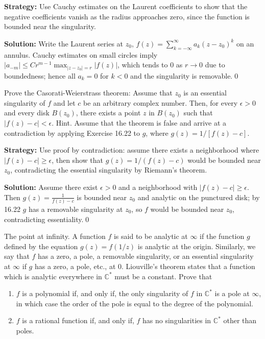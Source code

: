 \noindent\textbf{Strategy:} Use Cauchy estimates on the Laurent coefficients to show that the negative coefficients vanish as the radius approaches zero, since the function is bounded near the singularity.

\bigskip\noindent\textbf{Solution:}
Write the Laurent series at $z_0$, $f(z)=\sum_{k=-\infty}^{\infty} a_k(z-z_0)^k$ on an annulus. Cauchy estimates on small circles imply $|a_{-m}|\le C r^{m-1}\max_{|z-z_0|=r}|f(z)|$, which tends to $0$ as $r\to0$ due to boundedness; hence all $a_{k}=0$ for $k<0$ and the singularity is removable.\qed


\begin{problembox}
Prove the Casorati-Weierstrass theorem: Assume that \( z_0 \) is an essential singularity of \( f \) and let \( c \) be an arbitrary complex number. Then, for every \( \epsilon > 0 \) and every disk \( B(z_0) \), there exists a point \( z \) in \( B(z_0) \) such that \( |f(z) - c| < \epsilon \). Hint. Assume that the theorem is false and arrive at a contradiction by applying Exercise 16.22 to \( g \), where \( g(z) = 1/[f(z) - c] \).
\end{problembox}

\noindent\textbf{Strategy:} Use proof by contradiction: assume there exists a neighborhood where \( |f(z) - c| \geq \epsilon \), then show that \( g(z) = 1/(f(z) - c) \) would be bounded near \( z_0 \), contradicting the essential singularity by Riemann's theorem.

\bigskip\noindent\textbf{Solution:}
Assume there exist $\epsilon>0$ and a neighborhood with $|f(z)-c|\ge\epsilon$. Then $g(z)=\frac{1}{f(z)-c}$ is bounded near $z_0$ and analytic on the punctured disk; by 16.22 $g$ has a removable singularity at $z_0$, so $f$ would be bounded near $z_0$, contradicting essentiality.\qed


\begin{problembox}
The point at infinity. A function \( f \) is said to be analytic at \( \infty \) if the function \( g \) defined by the equation \( g(z) = f(1/z) \) is analytic at the origin. Similarly, we say that \( f \) has a zero, a pole, a removable singularity, or an essential singularity at \( \infty \) if \( g \) has a zero, a pole, etc., at 0. Liouville's theorem states that a function which is analytic everywhere in \( \mathbb{C}^* \) must be a constant. Prove that
\begin{enumerate}[label=(\alph*)]
\item \( f \) is a polynomial if, and only if, the only singularity of \( f \) in \( \mathbb{C}^* \) is a pole at \( \infty \), in which case the order of the pole is equal to the degree of the polynomial.
\item \( f \) is a rational function if, and only if, \( f \) has no singularities in \( \mathbb{C}^* \) other than poles.
\end{enumerate}
\end{problembox}


